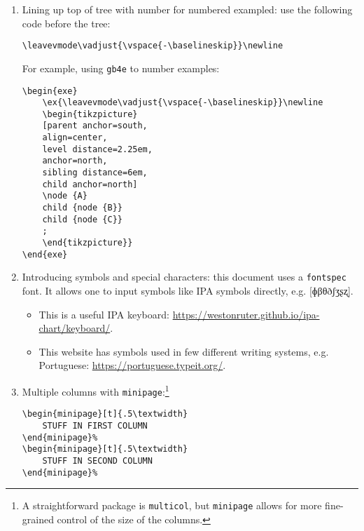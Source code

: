 \documentclass[11pt]{article}
\begin{document}
\begin{enumerate}
    \item Lining up top of tree with number for numbered exampled: use the following code before the tree:
    
    \begin{verbatim}
\leavevmode\vadjust{\vspace{-\baselineskip}}\newline
    \end{verbatim}
    
    For example, using \texttt{gb4e} to number examples:
    
    \begin{verbatim}
\begin{exe}
    \ex{\leavevmode\vadjust{\vspace{-\baselineskip}}\newline
    \begin{tikzpicture}
    [parent anchor=south,
    align=center,
    level distance=2.25em,
    anchor=north,
    sibling distance=6em,
    child anchor=north]
    \node {A}
    child {node {B}}
    child {node {C}}
    ;
    \end{tikzpicture}}
\end{exe}    
    \end{verbatim}
    
    \item Introducing symbols and special characters: this document uses a \texttt{fontspec} font. It allows one to input symbols like IPA symbols directly, e.g. [ɸβθðʃʒʂʐ].
    
    \begin{itemize}
        \item This is a useful IPA keyboard: \url{https://westonruter.github.io/ipa-chart/keyboard/}.
        \item This website has symbols used in few different writing systems, e.g. Portuguese: \url{https://portuguese.typeit.org/}.
    \end{itemize}
    
    \item Multiple columns with \texttt{minipage}:\footnote{A straightforward package is \texttt{multicol}, but \texttt{minipage} allows for more fine-grained control of the size of the columns.}
    
    \begin{verbatim}
\begin{minipage}[t]{.5\textwidth}
    STUFF IN FIRST COLUMN
\end{minipage}%
\begin{minipage}[t]{.5\textwidth}
    STUFF IN SECOND COLUMN
\end{minipage}%
    \end{verbatim}
    
\end{enumerate}
\end{document}
